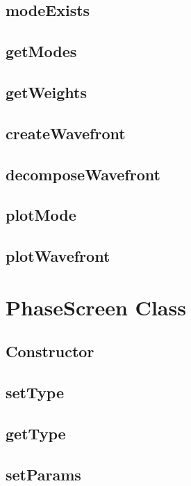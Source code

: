 \documentclass{article}
\begin{document}
\subsection{modeExists}

\subsection{getModes}

\subsection{getWeights}

\subsection{createWavefront}

\subsection{decomposeWavefront}

\subsection{plotMode}

\subsection{plotWavefront}

\section{PhaseScreen Class}
\subsection{Constructor}

\subsection{setType}

\subsection{getType}

\subsection{setParams}
\end{document}
